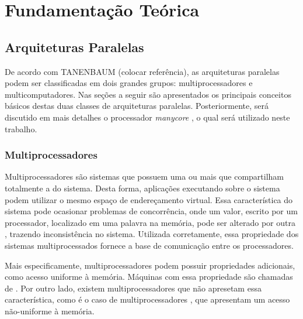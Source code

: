 \chapter{Fundamentação Teórica}


\section{Arquiteturas Paralelas}

De acordo com TANENBAUM (colocar referência), as arquiteturas paralelas podem ser classificadas em
dois grandes grupos: multiprocessadores e multicomputadores. Nas seções a seguir são apresentados os
principais conceitos básicos destas duas classes de arquiteturas paralelas. Posteriormente, será discutido
em mais detalhes o processador \textit{manycore} \mppa, o qual será utilizado neste trabalho.


\subsection{Multiprocessadores}




Multiprocessadores são sistemas que possuem uma ou mais \cpus que compartilham totalmente
a \ram do sistema. Desta forma, aplicações executando sobre o sistema podem
utilizar o mesmo espaço de endereçamento virtual. Essa característica do sistema
pode ocasionar problemas de concorrência, onde um valor, escrito por um
processador, localizado em uma palavra na memória, pode ser alterado por outra \cpu, trazendo
inconsistência no sistema. Utilizada corretamente, essa propriedade dos sistemas
multiprocessados fornece a base de comunicação entre os processadores.

Mais especificamente, multiprocessadores podem possuir propriedades adicionais,
como acesso uniforme à memória. Máquinas com essa propriedade são chamadas de
\uma. Por outro lado, existem multiprocessadores que não apresetam essa
característica, como é o caso de multiprocessadores \numa, que apresentam um acesso
não-uniforme à memória.

